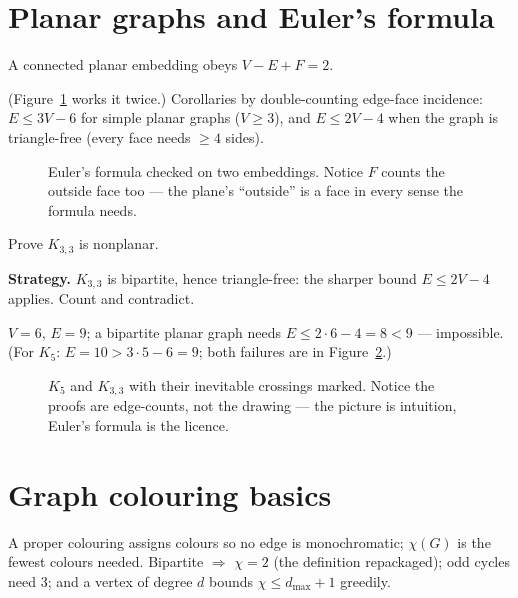 \section{Planar graphs and Euler's formula}\label{sec:planar}
\begin{theorem}
A connected planar embedding obeys $V - E + F = 2$.
\end{theorem}
(Figure~\ref{fig:eulerf} works it twice.) Corollaries by double-counting
edge-face incidence: $E \le 3V - 6$ for simple planar graphs ($V \ge 3$),
and $E \le 2V - 4$ when the graph is triangle-free (every face needs
$\ge 4$ sides).

\begin{figure}[ht]\centering

\caption{Euler's formula checked on two embeddings. Notice $F$ counts
the outside face too --- the plane's ``outside'' is a face in every
sense the formula needs.}
\label{fig:eulerf}
\end{figure}

\begin{example}\label{ex:k33}
Prove $K_{3,3}$ is nonplanar.
\par\smallskip
\textbf{Strategy.} $K_{3,3}$ is bipartite, hence triangle-free: the
sharper bound $E \le 2V - 4$ applies. Count and contradict.
\par\smallskip
\begin{solution}
$V = 6$, $E = 9$; a bipartite planar graph needs $E \le 2\cdot 6 - 4
= 8 < 9$ --- impossible. (For $K_5$: $E = 10 > 3\cdot 5 - 6 = 9$; both
failures are in Figure~\ref{fig:k5k33}.)
\end{solution}
\end{example}

\begin{figure}[ht]\centering

\caption{$K_5$ and $K_{3,3}$ with their inevitable crossings marked.
Notice the proofs are edge-counts, not the drawing --- the picture is
intuition, Euler's formula is the licence.}
\label{fig:k5k33}
\end{figure}

\section{Graph colouring basics}\label{sec:color}
A proper colouring assigns colours so no edge is monochromatic;
$\chi(G)$ is the fewest colours needed. Bipartite $\Rightarrow$
$\chi = 2$ (the definition repackaged); odd cycles need $3$; and a
vertex of degree $d$ bounds $\chi \le d_{\max} + 1$ greedily.

